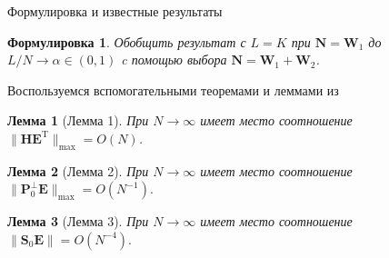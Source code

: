 \documentclass[notheorems, handout]{beamer}
\newtheorem{lemma}{Лемма}
\newtheorem{formulation}{Формулировка}
\begin{document}
	\begin{frame}{Формулировка и известные результаты}
		\begin{formulation}
			Обобщить результат \cite{ZNekrutkin} с $L=K$ при $\mathbf{N}=\mathbf{W}_1$ до $L/N\to \alpha \in (0,1)$ c помощью выбора $\mathbf{N}=\mathbf{W}_1+\mathbf{W}_2$.
		\end{formulation}
		Воспользуемся вспомогательными теоремами и леммами из \cite{ZNekrutkin}
		\begin{lemma}[Лемма 1]\label{lem:2}
			При $N\rightarrow\infty$ имеет место соотношение $\|\mathbf{HE}^\mathrm{T}\|_{\max} = O(N)$.
		\end{lemma}
		\begin{lemma}[Лемма 2]
			При $N\rightarrow\infty$ имеет место соотношение $\|\mathbf{P}_0^{\bot}\mathbf{E}\|_{\max} = O(N^{-1}).$
		\end{lemma}
		\begin{lemma}[Лемма 3]
			При $N\rightarrow\infty$ имеет место соотношение $\|\mathbf{S}_0\mathbf{E}\|=O(N^{-4}).$
		\end{lemma}
	\end{frame}
\end{document}
